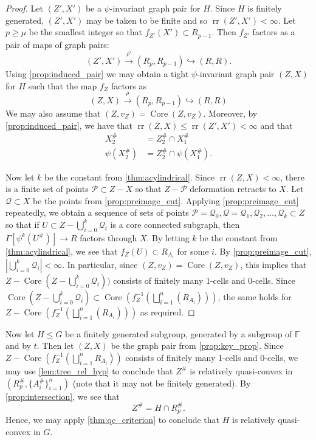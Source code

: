 \documentclass[11pt, a4paper]{amsart}
\theoremstyle{definition}
\newcommand{\F}{\mathbb{F}}
\def\injects{\hookrightarrow}
\DeclareMathOperator{\rr}{rr}
\DeclareMathOperator{\core}{Core}
\begin{document}
\begin{proof}
Let $(Z', X')$ be a $\psi$-invariant graph pair for $H$. Since $H$ is finitely generated, $(Z', X')$ may be taken to be finite and so $\rr(Z', X')<\infty$. Let $p\geqslant \mu$ be the smallest integer so that $f_{Z'}(X')\subset R_{p-1}$. Then $f_{Z'}$ factors as a pair of maps of graph pairs:
\[
(Z', X') \xrightarrow{\rho'}(R_{p}, R_{p-1}) \injects (R, R).
\]
Using \cref{prop:induced_pair} we may obtain a tight $\psi$-invariant graph pair $(Z, X)$ for $H$ such that the map $f_Z$ factors as
\[
(Z, X) \xrightarrow{\rho}(R_{p}, R_{p-1}) \injects (R, R)
\]
We may also assume that $(Z, v_Z) = \core(Z, v_Z)$. Moreover, by \cref{prop:induced_pair}, we have that $\rr(Z, X)\leqslant \rr(Z', X')<\infty$ and that
\begin{align*}
X_2^{\#} &= Z_2^{\#}\cap X_1^{\#}\\
\psi(X_2^{\#}) &= Z_2^{\#}\cap \psi(X_1^{\#}).
\end{align*}

Now let $k$ be the constant from \cref{thm:acylindrical}. Since $\rr(Z, X)<\infty$, there is a finite set of points $\mathcal{P}\subset Z - X$ so that $Z - \mathcal{P}$ deformation retracts to $X$. Let $\mathcal{Q}\subset X$ be the points from \cref{prop:preimage_cut}. Applying \cref{prop:preimage_cut} repeatedly, we obtain a sequence of sets of points $\mathcal{P} = \mathcal{Q}_0, \mathcal{Q} = \mathcal{Q}_1, \mathcal{Q}_2, \ldots, \mathcal{Q}_k\subset Z$ so that if $U\subset Z - \bigcup_{i=0}^k\mathcal{Q}_i$ is a core connected subgraph, then $\Gamma[\psi^k(U^{\#})]\to R$ factors through $X$. By letting $k$ be the constant from \cref{thm:acylindrical}, we see that $f_Z(U)\subset R_{A_i}$ for some $i$. By \cref{prop:preimage_cut}, $|\bigcup_{i=0}^k\mathcal{Q}_i|<\infty$. In particular, since $(Z, v_Z) = \core(Z, v_Z)$, this implies that $Z - \core(Z -  \bigcup_{i=0}^k\mathcal{Q}_i))$ consists of finitely many 1-cells and 0-cells. Since $\core(Z - \bigcup_{i=0}^k\mathcal{Q}_i)\subset  \core(f_Z^{-1}(\bigsqcup_{i=1}^n(R_{A_i})))$, the same holds for $Z - \core(f_Z^{-1}(\bigsqcup_{i=1}^n(R_{A_i})))$ as required.
\end{proof}




Now let $H\leqslant G$ be a finitely generated subgroup, generated by a subgroup of $\F$ and by $t$. Then let $(Z, X)$ be the graph pair from \cref{prop:key_prop}. Since $Z - \core(f_Z^{-1}(\bigsqcup_{i=1}^nR_{A_i}))$ consists of finitely many 1-cells and 0-cells, we may use \cref{lem:tree_rel_hyp} to conclude that $Z^{\#}$ is relatively quasi-convex in $(R_{p}^{\#}, \{A_i^{\#}\}_{i=1}^n)$ (note that it may not be finitely generated). By \cref{prop:intersection}, we see that
\[
Z^{\#} = H\cap R_{p}^{\#}.
\]
Hence, we may apply \cref{thm:qc_criterion} to conclude that $H$ is relatively quasi-convex in $G$.
\end{document}

